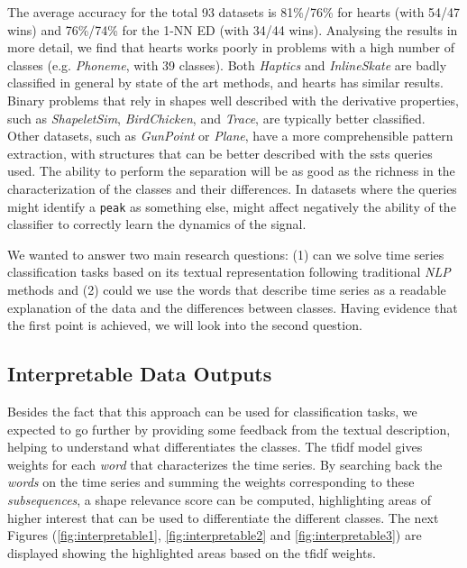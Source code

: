 The average accuracy for the total 93 datasets is 81\%/76\% for \gls{hearts} (with 54/47 wins) and 76\%/74\% for the 1-NN ED (with 34/44 wins). Analysing the results in more detail, we find that \gls{hearts} works poorly in problems with a high number of classes (e.g. \textit{Phoneme}, with 39 classes). Both \textit{Haptics} and \textit{InlineSkate} are badly classified in general by state of the art methods, and \gls{hearts} has similar results. Binary problems that rely in shapes well described with the derivative properties, such as \textit{ShapeletSim}, \textit{BirdChicken}, and \textit{Trace}, are typically better classified. Other datasets, such as \textit{GunPoint} or \textit{Plane}, have a more comprehensible pattern extraction, with structures that can be better described with the \gls{ssts} queries used. The ability to perform the separation will be as good as the richness in the characterization of the classes and their differences. In datasets where the queries might identify a \texttt{peak} as something else, might affect negatively the ability of the classifier to correctly learn the dynamics of the signal.

We wanted to answer two main research questions: (1) can we solve time series classification tasks based on its textual representation following traditional \textit{NLP} methods and (2) could we use the words that describe time series as a readable explanation of the data and the differences between classes. Having evidence that the first point is achieved, we will look into the second question.

\subsection{Interpretable Data Outputs}

Besides the fact that this approach can be used for classification tasks, we expected to go further by providing some feedback from the textual description, helping to understand what differentiates the classes. The \gls{tfidf} model gives weights for each \textit{word} that characterizes the time series. By searching back the \textit{words} on the time series and summing the weights corresponding to these \textit{subsequences}, a shape relevance score can be computed, highlighting areas of higher interest that can be used to differentiate the different classes. The next Figures (\ref{fig:interpretable1}, \ref{fig:interpretable2} and \ref{fig:interpretable3}) are displayed showing the highlighted areas based on the \gls{tfidf} weights.

